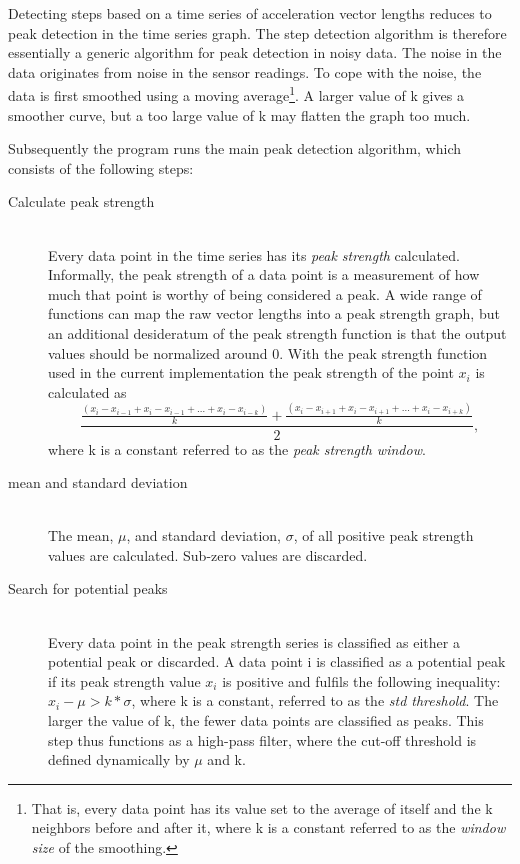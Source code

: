 Detecting steps based on a time series of acceleration vector lengths reduces to peak detection in the time series graph. The step detection algorithm is therefore essentially a generic algorithm for peak detection in noisy data. The noise in the data originates from noise in the sensor readings. To cope with the noise, the data is first smoothed using a moving average\footnote{That is, every data point has its value set to the average of itself and the k neighbors before and after it, where k is a constant referred to as the \emph{window size} of the smoothing.}. A larger value of k gives a smoother curve, but a too large value of k may flatten the graph too much.

Subsequently the program runs the main peak detection algorithm, which consists of the following steps:
\begin{description}

\item[Calculate peak strength] \hfill \\
Every data point in the time series has its \emph{peak strength} calculated. Informally, the peak strength of a data point is a measurement of how much that point is worthy of being considered a peak. A wide range of functions can map the raw vector lengths into a peak strength graph, but an additional desideratum of the peak strength function is that the output values should be normalized around 0. With the peak strength function used in the current implementation the peak strength of the point $x_i$ is calculated as $$\frac{\frac{(x_{i} - x_{i-1} + x_{i} - x_{i-1} + \ldots + x_{i} - x_{i-k})}{k} + \frac{(x_{i} - x_{i+1} + x_{i} - x_{i+1} + \ldots + x_{i} - x_{i+k})}{k}}{2},$$ where k is a constant referred to as the \emph{peak strength window}. 

\item [mean and standard deviation] \hfill \\
The mean, $\mu$, and standard deviation, $\sigma$, of all positive peak strength values are calculated. Sub-zero values are discarded.

\item[Search for potential peaks] \hfill \\
Every data point in the peak strength series is classified as either a potential peak or discarded. A data point i is classified as a potential peak if its peak strength value $x_i$ is positive and fulfils the following inequality: $x_i - \mu > k * \sigma$, where k is a constant, referred to as the \emph{std threshold}. The larger the value of k, the fewer data points are classified as peaks. This step thus functions as a high-pass filter, where the cut-off threshold is defined dynamically by $\mu$ and k.


\end{description}
